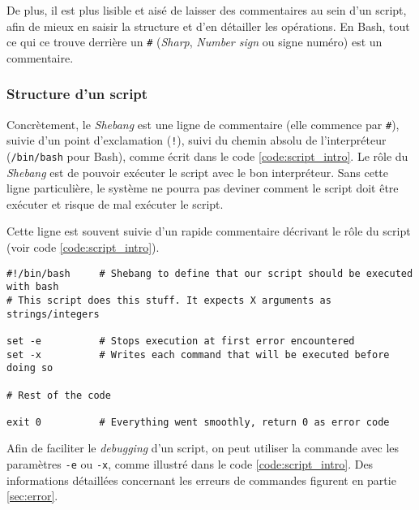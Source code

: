 De plus, il est plus lisible et aisé de laisser des commentaires au sein d'un script, afin de mieux en saisir la structure et d'en détailler les opérations. En Bash, tout ce qui ce trouve derrière un \texttt{\#} (\textit{Sharp}, \textit{Number sign} ou signe numéro) est un commentaire.

\subsubsection{Structure d'un script}
\begin{center}
\end{center}
\vspace{-0.5cm}
Concrètement, le \textit{Shebang} est une ligne de commentaire (elle commence par \texttt{\#}), suivie d'un point d'exclamation (\texttt{!}), suivi du chemin absolu de l'interpréteur (\texttt{/bin/bash} pour Bash), comme écrit dans le code \ref{code:script_intro}. Le rôle du \textit{Shebang} est de pouvoir exécuter le script avec le bon interpréteur. Sans cette ligne particulière, le système ne pourra pas deviner comment le script doit être exécuter et risque de mal exécuter le script.

Cette ligne est souvent suivie d’un rapide commentaire décrivant le rôle du script (voir code \ref{code:script_intro}).

\begin{code}
    \begin{verbatim}
#!/bin/bash     # Shebang to define that our script should be executed with bash
# This script does this stuff. It expects X arguments as strings/integers

set -e          # Stops execution at first error encountered
set -x          # Writes each command that will be executed before doing so

# Rest of the code

exit 0          # Everything went smoothly, return 0 as error code
    \end{verbatim}
    
    \vspace{-0.5cm}
    \label{code:script_intro}
\end{code}

Afin de faciliter le \textit{debugging} d'un script, on peut utiliser la commande  avec les paramètres \texttt{-e} ou \texttt{-x}, comme illustré dans le code \ref{code:script_intro}. Des informations détaillées concernant les erreurs de commandes figurent en partie \ref{sec:error}.


